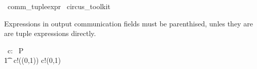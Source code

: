 
\begin{zsection}
  \SECTION\ comm\_tupleexpr \parents\ circus\_toolkit
\end{zsection}

Expressions in output communication fields must be parenthised,
unles they are are tuple expressions directly.
%
\begin{circus}
     \circchannel\ c: \nat \cross \nat
     \also
     \circprocess\ P \circdef\ \circbegin \\       
     	\t1 \circspot\ c!((0,1)) \then c!(0,1) \then \Skip \\
     \circend
\end{circus} 
